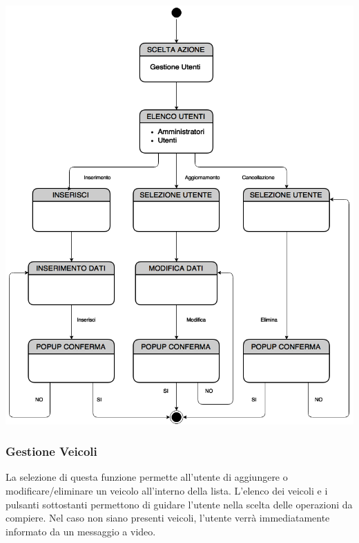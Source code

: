 \documentclass[a4paper,12pt]{beamer}
\begin{document}
\begin{frame}
\begin{center}
\includegraphics[scale=0.2]{../UseCase/Utenti.png}
\end{center}
\end{frame}

\begin{frame}
\frametitle{Gestione Veicoli}
La selezione di questa funzione permette all'utente di aggiungere o modificare/eliminare un veicolo all'interno della lista. L'elenco dei veicoli e i pulsanti sottostanti permettono di guidare l'utente nella scelta delle operazioni da compiere. Nel caso non siano presenti veicoli, l'utente verrà immediatamente informato da un messaggio a video.
\end{frame}
\end{document}
